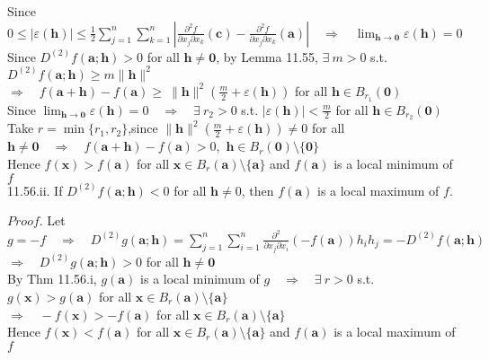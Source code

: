 \documentclass[12pt]{book}
\begin{document}
\begin{CJK}{UTF8}{bsmi}
Since $\displaystyle0\le|\varepsilon(\mathbf{h})|\le\frac{1}{2}\sum_{j=1}^n\sum_{k=1}^n\left|\frac{\partial^2 f}{\partial x_j\partial x_k}(\mathbf{c})-\frac{\partial^2 f}{\partial x_j\partial x_k}(\mathbf{a})\right|\quad\Rightarrow\quad\lim_{\mathbf{h}\rightarrow\mathbf{0}}\varepsilon(\mathbf{h})=0$ \\
Since $ D^{(2)}f(\mathbf{a};\mathbf{h})>0$ for all $\mathbf{h}\ne\mathbf{0}$, by Lemma 11.55, $\exists\ m>0$ s.t. $D^{(2)}f(\mathbf{a};\mathbf{h})\ge m\parallel\mathbf{h}\parallel^2$ \\
$\displaystyle\Rightarrow\quad f(\mathbf{a}+\mathbf{h})-f(\mathbf{a})\ge\ \parallel \mathbf{h}\parallel^2(\frac{m}{2}+\varepsilon(\mathbf{h}))$ for all $\mathbf{h}\in B_{r_1}(\mathbf{0})$ \\
Since $\displaystyle\lim_{\mathbf{h}\rightarrow\mathbf{0}}\varepsilon(\mathbf{h})=0\quad\Rightarrow\quad\exists\ r_2>0$ s.t. $\displaystyle|\varepsilon(\mathbf{h})|<\frac{m}{2}$ for all $\mathbf{h}\in B_{r_2}(\mathbf{0})$ \\
Take $r=\min\{r_1, r_2\}$,\quad since $\displaystyle\parallel \mathbf{h}\parallel^2(\frac{m}{2}+\varepsilon(\mathbf{h}))\ne0$ for all $\mathbf{h}\ne\mathbf{0}\quad\Rightarrow\quad f(\mathbf{a}+\mathbf{h})-f(\mathbf{a})>0$,\ $\mathbf{h}\in B_r(\mathbf{0})\setminus\{\mathbf{0}\}$ \\
Hence $f(\mathbf{x})>f(\mathbf{a})$ for all $\mathbf{x}\in B_r(\mathbf{a})\setminus\{\mathbf{a}\}$ and $f(\mathbf{a})$ is a local minimum of $f$ \\

11.56.ii. If $D^{(2)}f(\mathbf{a};\mathbf{h})<0$ for all $\mathbf{h}\ne0$, then $f(\mathbf{a})$ is a local maximum of $f$.

$Proof$. Let $\displaystyle g = -f\quad\Rightarrow\quad D^{(2)}g(\mathbf{a};\mathbf{h})=\sum_{j=1}^n\sum_{i=1}^n\frac{\partial^2}{\partial x_j\partial x_i}(-f(\mathbf{a}))h_ih_j=-D^{(2)}f(\mathbf{a};\mathbf{h})$ \\
$\Rightarrow\quad D^{(2)}g(\mathbf{a};\mathbf{h})>0$ for all $\mathbf{h}\ne\mathbf{0}$ \\
By Thm 11.56.i, $g(\mathbf{a})$ is a local minimum of $g\quad\Rightarrow\quad\exists\ r>0$ s.t. $g(\mathbf{x})>g(\mathbf{a})$ for all $\mathbf{x}\in B_r(\mathbf{a})\setminus\{\mathbf{a}\}$ \\
$\Rightarrow\quad -f(\mathbf{x})>-f(\mathbf{a})$ for all $\mathbf{x}\in B_r(\mathbf{a})\setminus\{\mathbf{a}\}$ \\
Hence $f(\mathbf{x})<f(\mathbf{a})$ for all $\mathbf{x}\in B_r(\mathbf{a})\setminus\{\mathbf{a}\}$ and $f(\mathbf{a})$ is a local maximum of $f$ \\


\end{CJK}
\end{document}
